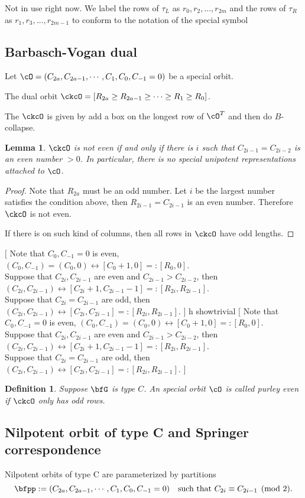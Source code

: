 \documentclass[12pt,a4paper]{amsart}
\newcommand{\trivial}[2][]{\if\relax\detokenize{#1}\relax
  {%
      \color{orange} \vspace{0em} $[$  #2 $]$
      \color{black}
  }
  \else
\ifx#1h
\ifcsname showtrivial\endcsname
{%
    \color{orange} \vspace{0em}  $[$ #2 $]$
    \color{black}
}
\fi
\else {\red Wrong argument!} \fi
\fi
}
\numberwithin{equation}{section}
\newtheorem{lem}[thm]{Lemma}
\newtheorem{defn}[thm]{Definition}
\theoremstyle{remark}
\begin{document}
{\color{blue} Not in use right now.  We label the rows of $\tau_L$ as
  $r_0,r_2,\dots ,r_{2m}$ and the rows of $\tau_R$ as $r_1,r_3,\dots ,r_{2m-1}$
  to conform to the notation of the special symbol }

\subsection{Barbasch-Vogan dual}
Let $\cO=(C_{2a},C_{2a-1}, \cdots, C_1,C_0,C_{-1}=0)$ be a special orbit.



The dual orbit $\ckcO = [R_{2a}\geq R_{2a-1}\geq \cdots \geq R_1\geq R_0]$.

{\color{red} The $\ckcO$ is given by add a box on the longest row of $\cO^T$ and
  then do $B$-collapse.}

\begin{lem}\label{lem:C.even}
  $\ckcO$ is not even if and only if there is $i$ such that $C_{2i-1}= C_{2i-2}$
  is an even number $>0$.  In particular, there is no special unipotent
  representations attached to $\cO$.
\end{lem}
\begin{proof}
  Note that $R_{2a}$ must be an odd number. Let $i$ be the largest number
  satisfies the condition above, then $R_{2i-1}=C_{2i-1}$ is an even
  number. Therefore $\ckcO$ is not even.

  If there is on such kind of columns, then all rows in $\ckcO$ have odd
  lengths.
\end{proof}

\trivial{ Note that $C_0,C_{-1}=0$ is even,
  $(C_0,C_{-1})=(C_0,0)\leftrightarrow [C_0+1,0]=:[R_0,0]$. \\
  Suppose that $C_{2i},C_{2i-1}$ are even and $C_{2i-1}>C_{2i-2}$, then
  $(C_{2i},C_{2i-1})\leftrightarrow [C_{2i}+1,C_{2i-1}-1]=:[R_{2i},R_{2i-1}]$. \\
  Suppose that $C_{2i}=C_{2i-1}$ are odd, then
  $(C_{2i},C_{2i-1})\leftrightarrow [C_{2i},C_{2i-1}]=:[R_{2i},R_{2i-1}]$.  }

\begin{defn}
  Suppose $\bfG$ is type $C$.  An special orbit $\cO$ is called purley even if
  $\ckcO$ only has odd rows.
  
\end{defn}

\subsection{Nilpotent orbit of type C and Springer correspondence}
Nilpotent orbits of type C are parameterized by partitions
\[
  \bfpp:= (C_{2a},C_{2a-1},\cdots, C_1, C_0, C_{-1}=0) \quad \text{such that
    $C_{2i}\equiv C_{2i-1}\pmod{2}$}.
\]
\end{document}
